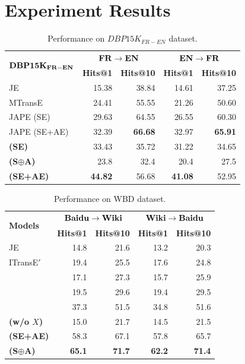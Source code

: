 


\section{Experiment Results\label{sec:results}}


\begin{table}
	\centering
	\scriptsize
	\begin{tabular}{lrrrr}
		\toprule
		\multirow{2}{*}{$\bf DBP15K_{FR-EN}$} & \multicolumn{2}{c|}{$\bf FR \rightarrow EN$} & \multicolumn{2}{c}{$\bf EN \rightarrow FR$} \\
		& \bf Hits@1 & \bf Hits@10 & \bf Hits@1 & \bf Hits@10 \\
		\midrule
		\rowcolor{Gray}JE & 15.38 & 38.84 & 14.61 & 37.25 \\
		MTransE & 24.41 & 55.55 & 21.26 & 50.60 \\
		\rowcolor{Gray}JAPE (SE) & 29.63 & 64.55 & 26.55 & 60.30 \\
		JAPE (SE+AE) & 32.39 & \bf 66.68 & 32.97 & \bf 65.91 \\
		\rowcolor{Gray} \bf \HRGCN (SE) & 33.43& 35.72& 31.22& 34.65 \\
		\bf \HRGCN (S$\oplus$A) & 23.8 & 32.4 & 20.4 & 27.5 \\
        \rowcolor{Gray} 	\bf \HRGCN (SE+AE) & \bf 44.82 & 56.68 &\bf 41.08 & 52.95 \\
		\bottomrule
	\end{tabular}
	\caption{Performance on $DBP15K_{FR-EN}$ dataset.}
	\label{cross}
\end{table}

\begin{table}
	\centering
	\scriptsize
	\begin{tabular}{lrrrr}
		\toprule
		\multirow{2}{*}{\bf Models} &  \multicolumn{2}{c|}{$\bf Baidu \rightarrow Wiki$} & \multicolumn{2}{c}{$\bf Wiki \rightarrow Baidu$} \\
		& \bf Hits@1 & \bf Hits@10 & \bf Hits@1 & \bf Hits@10 \\
		\midrule
		\rowcolor{Gray} JE & 14.8 & 21.6 & 13.2 & 20.3 \\
		ITransE$'$ & 19.4 & 25.5 & 17.6 & 24.8 \\
		\rowcolor{Gray} \GCN & 17.1 & 27.3 & 15.7 & 25.9 \\
		\HGCN & 19.5 & 29.6 & 19.4 & 29.5  \\
		\rowcolor{Gray} \RGCN & 37.3 & 51.5 & 34.8 & 51.6 \\
		\bf \HRGCN (w/o $X$) & 15.0 & 21.7 & 14.5 & 21.5 \\
		\rowcolor{Gray} \bf \HRGCN (SE+AE) & 58.3 & 67.1 & 57.8{\tiny } & 65.7 \\
		\bf \HRGCN (S$\oplus$A) & \bf 65.1 & \bf 71.7 & \bf 62.2 & \bf 71.4\\
		\bottomrule
	\end{tabular}
	\caption{Performance on WBD dataset.}
	\label{f1}
\end{table}
